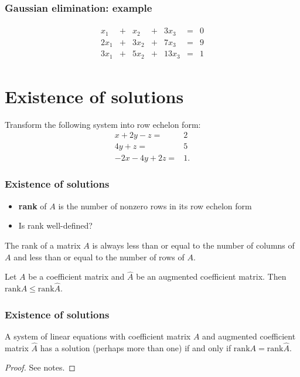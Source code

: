 \documentclass[compress]{beamer}
\newcommand{\rank}{\mathrm{rank}}
\theoremstyle{definition}
\begin{document}
\begin{frame}
  \frametitle{Gaussian elimination: example} 
  \begin{align*}
    \begin{array}{ccccccc}
      x_1  &+ & x_2  &+& 3 x_3 &=& 0 \\
      2x_1 &+ & 3x_2 &+&  7 x_3 &=& 9 \\
      3x_1 &+ & 5x_2 &+& 13x_3  &=& 1 
    \end{array}
  \end{align*}
\end{frame}

\section{Existence of solutions}
\begin{frame}
  Transform the following system into row echelon form:
  \begin{align*}
    x + 2 y - z = & 2 \\
    4 y + z = & 5 \\
    -2x - 4y + 2z = & 1.
  \end{align*}
\end{frame}

\begin{frame}
  \frametitle{Existence of solutions}
  \begin{itemize}
  \item \textbf{rank} of $A$ is the number of nonzero rows in its row
    echelon form
  \item Is rank well-defined?
  \end{itemize}
  
  \begin{lemma}\label{lem:rankcr}
    The rank of a matrix $A$ is always less than or equal to the number
    of columns of $A$ and less than or equal to the number of rows of $A$.
  \end{lemma}
  
  \begin{lemma}\label{lem:rankaug}
    Let $A$ be a coefficient matrix and $\hat{A}$ be an augmented
    coefficient matrix. Then $\rank A \leq \rank \hat{A}$.
  \end{lemma}
\end{frame}


\begin{frame}
  \frametitle{Existence of solutions}
  \begin{theorem}\label{thm:exist}
    A system of linear equations with coefficient matrix $A$ and
    augmented coefficient matrix $\hat{A}$ has a solution (perhaps more
    than one) if and only if $\rank A = \rank \hat{A}$.
  \end{theorem}
  \begin{proof}
    See notes.
  \end{proof}
\end{frame}
\end{document}
